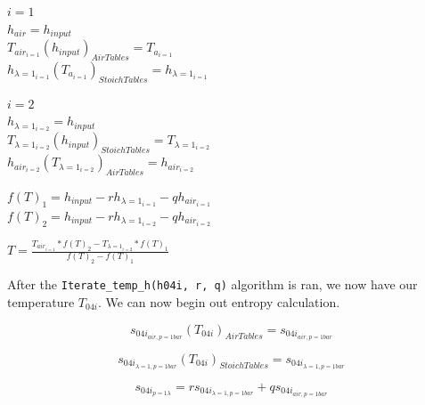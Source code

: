 \documentclass[titlepage]{article}
\begin{document}
    \begin{center}
        $i = 1$ \\
        $h_{air} = h_{input}$ \\
        $T_{air_{i=1}}(h_{input})_{Air Tables} = T_{a_{i=1}}$ \\
        $h_{\lambda= 1_{i=1}}(T_{a_{i=1}})_{Stoich Tables} = h_{\lambda=1_{i=1}}$ \\

        \vspace*{0.5cm}

        $i=2$ \\
        $h_{\lambda=1_{i=2}} = h_{input}$ \\
        $T_{\lambda=1_{i=2}}(h_{input})_{Stoich Tables} = T_{\lambda=1_{i=2}}$ \\
        $h_{air_{i=2}}(T_{\lambda=1_{i=2}})_{Air Tables} = h_{air_{i=2}}$ \\

        \vspace*{0.5cm}

        $f(T)_{1} = h_{input} - r h_{\lambda=1_{i=1}} - q h_{air_{i=1}}$ \\
        $f(T)_{2} = h_{input} - r h_{\lambda=1_{i=2}} - q h_{air_{i=2}}$ \\

        \vspace*{0.5cm}

        $T = \frac{T_{air_{i=1}} * f(T)_{2} - T_{\lambda=1_{i=2}} * f(T)_{1}}{f(T)_{2} - f(T)_{1}}$ \\
    \end{center}

    After the \verb|Iterate_temp_h(h04i, r, q)| algorithm is ran, we now have our temperature $T_{04i}$. We can now begin out 
    entropy calculation.
    
    \begin{equation}
        s_{04i_{air, p= 1 bar}}(T_{04i})_{Air Tables} = s_{04i_{air, p=1 bar}}
    \end{equation} 

    \begin{equation}
        s_{04i_{\lambda=1, p= 1 bar}}(T_{04i})_{Stoich  Tables} = s_{04i_{\lambda=1, p = 1 bar}}
    \end{equation}

    \begin{equation}
        s_{04i_{p=1 \lambda}} = r s_{04i_{\lambda=1, p=1 bar}} + q s_{04i_{air, p=1 bar}}
    \end{equation}
\end{document}
